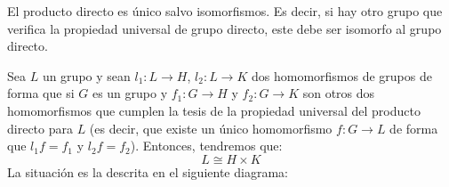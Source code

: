 El producto directo es único salvo isomorfismos. Es decir, si hay otro grupo que verifica la propiedad universal de grupo directo, este debe ser isomorfo al grupo directo.
\begin{teo}
    Sea $L$ un grupo y sean $l_1:L\to H$, $l_2:L\to K$ dos homomorfismos de grupos de forma que si $G$ es un grupo y $f_1:G\to H$ y $f_2:G\to K$ son otros dos homomorfismos que cumplen la tesis de la propiedad universal del producto directo para $L$ (es decir, que existe un único homomorfismo $f:G\to L$ de forma que $l_1f=f_1$ y $l_2f = f_2$). Entonces, tendremos que:
    \begin{equation*}
        L\cong H\times K
    \end{equation*}
    La situación es la descrita en el siguiente diagrama:
   \begin{figure}[H]
       \centering
   \end{figure}


\end{teo}

